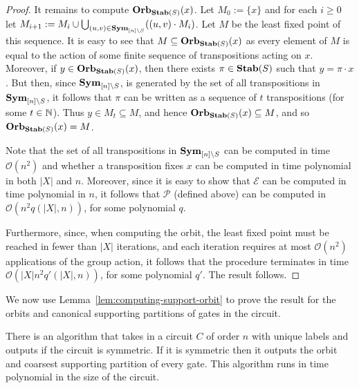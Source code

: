 \documentclass[../paper.tex]{subfiles}
\begin{document}
\begin{proof}
  It remains to compute $\text{\textbf{Orb}}_{\text{\textbf{Stab}}(S)}(x)$. Let $M_0 := \{x\}$ and for each $i
  \geq 0$ let $M_{i+1} := M_i\cup \bigcup_{(u,v) \in \text{\textbf{Sym}}_{[n] \setminus S}}
  ((u,v) \cdot M_i)$. Let $M$ be the least fixed point of this sequence. It is
  easy to see that $M \subseteq \text{\textbf{Orb}}_{\text{\textbf{Stab}}(S)}(x)$ as every element of $M$ is
  equal to the action of some finite sequence of transpositions acting on $x$.
  Moreover, if $y \in \text{\textbf{Orb}}_{\text{\textbf{Stab}}(S)}(x)$, then there exists $\pi \in \text{\textbf{Stab}}(S)$
  such that $y = \pi \cdot x$. But then, since $\text{\textbf{Sym}}_{[n] \setminus S}$, is
  generated by the set of all transpositions in $\text{\textbf{Sym}}_{[n] \setminus S}$, it
  follows that $\pi$ can be written as a sequence of $t$ transpositions (for
  some $t \in \mathbb{N}$). Thus $y \in M_t \subseteq M$, and hence
  $\text{\textbf{Orb}}_{\text{\textbf{Stab}}(S)}(x) \subseteq M$, and so $\text{\textbf{Orb}}_{\text{\textbf{Stab}}(S)}(x) = M$.

  Note that the set of all transpositions in $\text{\textbf{Sym}}_{[n] \setminus S}$ can be
  computed in time $\mathcal{O}(n^{2})$ and whether a transposition fixes $x$
  can be computed in time polynomial in both $\vert X \vert$ and $n$. Moreover,
  since it is easy to show that $\mathcal{E}$ can be computed in time polynomial
  in $n$, it follows that $\mathcal{P}$ (defined above) can be computed in
  $\mathcal{O} (n^{2} q(\vert X \vert, n))$, for some polynomial $q$.

  Furthermore, since, when computing the orbit, the least fixed point must be
  reached in fewer than $\vert X \vert$ iterations, and each iteration requires
  at most $\mathcal{O} (n^{2})$ applications of the group action, it follows
  that the procedure terminates in time $\mathcal{O}(\vert X \vert n^{2} q'
  (\vert X \vert, n))$, for some polynomial $q'$. The result follows.
\end{proof}

We now use Lemma~\ref{lem:computing-support-orbit} to prove the result for the
orbits and canonical supporting partitions of gates in the circuit.

\begin{lem}
  There is an algorithm that takes in a circuit $C$ of order $n$ with unique
  labels and outputs if the circuit is symmetric. If it is symmetric then it
  outputs the orbit and coarsest supporting partition of every gate. This
  algorithm runs in time polynomial in the size of the circuit.
  \label{lem:computing-support-orbit-gate}
\end{lem}
\end{document}
